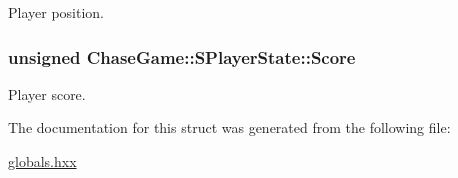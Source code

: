 Player position. 

\hypertarget{struct_chase_game_1_1_s_player_state_a268594c795a70cf1eb9fe6061bfa57d0}{
\subsubsection[{Score}]{\setlength{\rightskip}{0pt plus 5cm}unsigned Chase\-Game\-::\-S\-Player\-State\-::\-Score}}\label{struct_chase_game_1_1_s_player_state_a268594c795a70cf1eb9fe6061bfa57d0}


Player score. 



The documentation for this struct was generated from the following file\-:\begin{DoxyCompactItemize}
\item 
\hyperlink{globals_8hxx}{globals.\-hxx}\end{DoxyCompactItemize}
